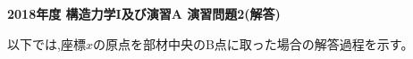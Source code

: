 \documentclass[10pt,a4j]{jarticle}
\newlength{\minitwocolumn}
\begin{document}
\newcommand{\fat}[1]{\mbox{\boldmath $#1$}}
\newcommand{\D}{\partial}
\newcommand{\w}{\omega}
\newcommand{\ga}{\alpha}
\newcommand{\gb}{\beta}
\newcommand{\gx}{\xi}
\newcommand{\gz}{\zeta}
\newcommand{\vhat}[1]{\hat{\fat{#1}}}
\newcommand{\spc}{\vspace{0.7\baselineskip}}
\newcommand{\halfspc}{\vspace{0.3\baselineskip}}

\pagestyle{empty}
\newcommand{\twofig}[2]
 {
   \begin{figure}
     \begin{minipage}[t]{\minitwocolumn}
         \begin{center}   #1
         \end{center}
     \end{minipage}
         \hspace{\columnsep}
     \begin{minipage}[t]{\minitwocolumn}
         \begin{center} #2
         \end{center}
     \end{minipage}
   \end{figure}
 }
\begin{center}
{\Large \bf 2018年度 構造力学I及び演習A 演習問題2(解答)} \\
\end{center}
\vspace{15mm}
以下では,座標$x$の原点を部材中央のB点に取った場合の解答過程を示す。
\end{document}
